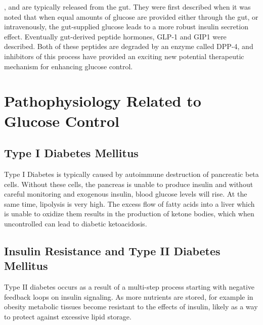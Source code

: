 \documentclass{tufte-handout}
\begin{document}
, and are typically released from the gut.  They were first described when it was noted that when equal amounts of glucose are provided either through the gut, or intravenously, the gut-supplied glucose leads to a more robust insulin secretion effect.  Eventually gut-derived peptide hormones, GLP-1 and GIP1 were described.  Both of these peptides are degraded by an enzyme called DPP-4, and inhibitors of this process have provided an exciting new potential therapeutic mechanism for enhancing glucose control.

\section{Pathophysiology Related to Glucose Control}

\subsection{Type I Diabetes Mellitus}

Type I Diabetes is typically caused by autoimmune destruction of pancreatic beta cells.  Without these cells, the pancreas is unable to produce insulin and without careful monitoring and exogenous insulin, blood glucose levels will rise.  At the same time, lipolysis is very high. The excess flow of fatty acids into a liver which is unable to oxidize them results in the production of ketone bodies, which when uncontrolled can lead to diabetic ketoacidosis.

\subsection{Insulin Resistance and Type II Diabetes Mellitus}

Type II diabetes occurs as a result of a multi-step process starting with negative feedback loops on insulin signaling.  As more nutrients are stored, for example in obesity metabolic tissues become resistant to the effects of insulin, likely as a way to protect against excessive lipid storage.  
\end{document}
